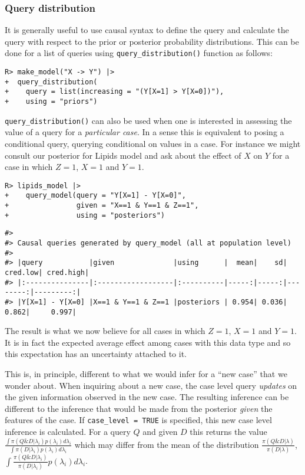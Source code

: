\documentclass[
  11pt,
  article]{jss}
\begin{document}
\FloatBarrier

\hypertarget{query-distribution}{%
\subsubsection{Query distribution}\label{query-distribution}}

It is generally useful to use causal syntax to define the query and
calculate the query with respect to the prior or posterior probability
distributions. This can be done for a list of queries using
\texttt{query\_distribution()} function as follows:

\begin{verbatim}
R> make_model("X -> Y") |> 
+  query_distribution(
+    query = list(increasing = "(Y[X=1] > Y[X=0])"), 
+    using = "priors")
\end{verbatim}

\texttt{query\_distribution()} can also be used when one is interested
in assessing the value of a query for a \emph{particular case}. In a
sense this is equivalent to posing a conditional query, querying
conditional on values in a case. For instance we might consult our
posterior for Lipids model and ask about the effect of \(X\) on \(Y\)
for a case in which \(Z=1\), \(X=1\) and \(Y=1\).

\begin{verbatim}
R> lipids_model |>
+    query_model(query = "Y[X=1] - Y[X=0]",
+                given = "X==1 & Y==1 & Z==1",
+                using = "posteriors")
\end{verbatim}

\begin{verbatim}
#> 
#> Causal queries generated by query_model (all at population level)
#> 
#> |query           |given              |using      |  mean|    sd| cred.low| cred.high|
#> |:---------------|:------------------|:----------|-----:|-----:|--------:|---------:|
#> |Y[X=1] - Y[X=0] |X==1 & Y==1 & Z==1 |posteriors | 0.954| 0.036|    0.862|     0.997|
\end{verbatim}

The result is what we now believe for all cases in which \(Z=1\),
\(X=1\) and \(Y=1\). It is in fact the expected average effect among
cases with this data type and so this expectation has an uncertainty
attached to it.

This is, in principle, different to what we would infer for a ``new
case'' that we wonder about. When inquiring about a new case, the case
level query \emph{updates} on the given information observed in the new
case. The resulting inference can be different to the inference that
would be made from the posterior \emph{given} the features of the case.
If \texttt{case\_level\ =\ TRUE} is specified, this new case level
inference is calculated. For a query \(Q\) and given \(D\) this returns
the value
\(\frac{\int\pi(Q \& D | \lambda_i)p(\lambda_i)d\lambda_i}{\int\pi(D | \lambda_i)p(\lambda_i)d\lambda_i}\)
which may differ from the mean of the distribution
\(\frac{\pi(Q \& D | \lambda)}{\pi(D | \lambda)}\),
\(\int \frac{\pi(Q \& D | \lambda_i)}{\pi(D | \lambda_i)} p(\lambda_i)d\lambda_i\).
\end{document}
